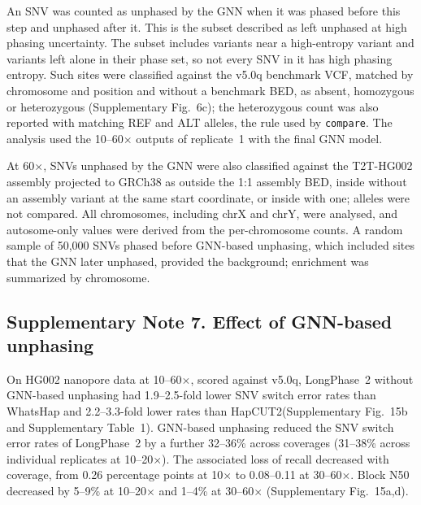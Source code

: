 \documentclass[11pt,a4paper]{article}
\newcommand{\toolname}{LongPhase~2\xspace}
\newcommand{\whatshap}{WhatsHap\xspace}
\newcommand{\hapcut}{HapCUT2\xspace}
\begin{document}
An SNV was counted as unphased by the GNN when it was phased before this step and unphased after it. This is the subset described as left unphased at high phasing uncertainty.  The subset includes variants near a high-entropy variant and variants left alone in their phase set, so not every SNV in it has high phasing entropy.  Such sites were classified against the v5.0q benchmark VCF, matched by chromosome and position and without a benchmark BED, as absent, homozygous or heterozygous (Supplementary Fig.~6c); the heterozygous count was also reported with matching REF and ALT alleles, the rule used by \texttt{compare}.  The analysis used the 10--60$\times$ outputs of replicate~1 with the final GNN model.

At 60$\times$, SNVs unphased by the GNN were also classified against the T2T-HG002 assembly projected to GRCh38 as outside the 1:1 assembly BED, inside without an assembly variant at the same start coordinate, or inside with one; alleles were not compared.  All chromosomes, including chrX and chrY, were analysed, and autosome-only values were derived from the per-chromosome counts.  A random sample of 50,000 SNVs phased before GNN-based unphasing, which included sites that the GNN later unphased, provided the background; enrichment was summarized by chromosome.




\subsection*{Supplementary Note 7. Effect of GNN-based unphasing}
On HG002 nanopore data at 10--60$\times$, scored against v5.0q, \toolname without GNN-based unphasing had 1.9--2.5-fold lower SNV switch error rates than \whatshap and 2.2--3.3-fold lower rates than \hapcut (Supplementary Fig.~15b and Supplementary Table~1). GNN-based unphasing reduced the SNV switch error rates of \toolname by a further 32--36\% across coverages (31--38\% across individual replicates at 10--20$\times$). The associated loss of recall decreased with coverage, from 0.26 percentage points at 10$\times$ to 0.08--0.11 at 30--60$\times$. Block N50 decreased by 5--9\% at 10--20$\times$ and 1--4\% at 30--60$\times$ (Supplementary Fig.~15a,d).
\end{document}
